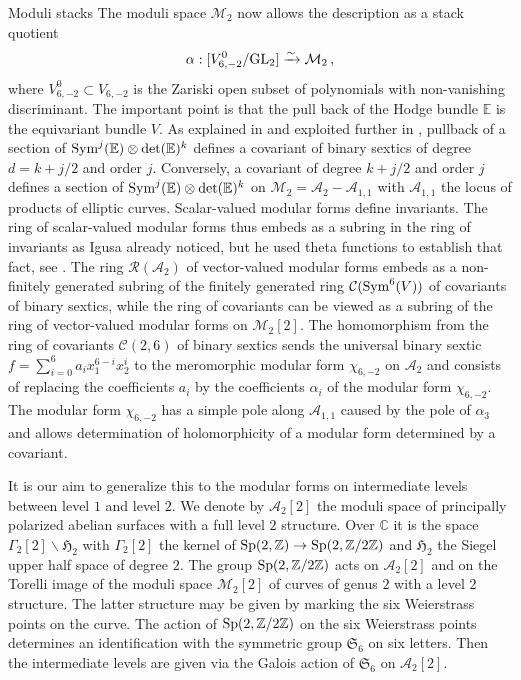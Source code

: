 \documentclass[12pt]{amsart}
\numberwithin{equation}{section}
\newcommand{\CC}{\mathbb C}
\newcommand{\EE}{\mathbb E}
\newcommand{\ZZ}{\mathbb Z}
\numberwithin{equation}{section}
\theoremstyle{definition}
\theoremstyle{remark}
\begin{document}
\begin{section}{Moduli stacks}
The moduli space $\mathcal{M}_2$ now allows the description as a stack quotient
$$
\alpha: [V_{6,-2}^0/{\rm GL}_2] \xrightarrow{\sim} \mathcal{M}_2\, ,
$$
where $V_{6,-2}^0 \subset V_{6,-2}$ is the Zariski open subset of polynomials with
non-vanishing discriminant. The important point is that the pull back of the Hodge
bundle ${\EE}$ is the equivariant bundle $V$. As explained in \cite{CFG1} and exploited further
in \cite{CFG2}, pullback of a section of ${\rm Sym}^j({\EE})\otimes \det({\EE})^k$
defines a covariant of binary sextics of degree $d=k+j/2$ and order $j$. Conversely, a covariant
of degree $k+j/2$ and order $j$ defines a section of ${\rm Sym}^j({\EE})\otimes \det({\EE})^k$
on $\mathcal{M}_2=\mathcal{A}_2-\mathcal{A}_{1,1}$ with $\mathcal{A}_{1,1}$
the locus of products of elliptic curves. Scalar-valued modular forms define invariants. 
The ring of scalar-valued modular forms
thus embeds as a subring in the ring of invariants as Igusa already noticed, but he used
theta functions to establish that fact, see \cite{Igusa1964}. The ring 
$\mathcal{R}(\mathcal{A}_2)$
of vector-valued modular forms
embeds as a non-finitely generated subring of the finitely generated ring $\mathcal{C}({\rm Sym}^6(V))$
of covariants
of binary sextics, while the ring of covariants can be viewed as a subring 
of the ring of vector-valued modular forms on $\mathcal{M}_2[2]$.
The homomorphism from the ring of covariants $\mathcal{C}(2,6)$ of
binary sextics sends the universal binary sextic $f=\sum_{i=0}^6 a_i x_1^{6-i}x_2^i$ 
to the meromorphic modular form
$\chi_{6,-2}$ on $\mathcal{A}_2$ 
and consists of replacing the coefficients $a_i$ by the coefficients $\alpha_i$
of the modular form $\chi_{6,-2}$. The modular form $\chi_{6,-2}$ has a simple pole
along $\mathcal{A}_{1,1}$ caused by the pole of $\alpha_3$ and allows determination of
holomorphicity of a modular form determined by a covariant.

\bigskip

It is our aim to generalize this to the modular forms on intermediate levels between
level $1$ and level $2$. We denote by $\mathcal{A}_2[2]$ the moduli space of
principally polarized abelian surfaces with a full level $2$ structure.
Over ${\CC}$ it is the space $\Gamma_2[2]\backslash \mathfrak{H}_2$ with
$\Gamma_2[2]$ the kernel of ${\rm Sp}(2,{\ZZ}) \to {\rm Sp}(2,{\ZZ}/2{\ZZ})$
and $\mathfrak{H}_2$ the Siegel upper half space of degree $2$.
The group ${\rm Sp}(2,{\ZZ}/2{\ZZ})$ acts on $\mathcal{A}_2[2]$ and on the 
Torelli image of the moduli space $\mathcal{M}_2[2]$ of curves of genus $2$ with a level $2$ structure.
The latter structure may be given by marking the six Weierstrass points on the curve.
The action of ${\rm Sp}(2,{\ZZ}/2{\ZZ})$ on the six Weierstrass points determines
an identification with the symmetric group $\mathfrak{S}_6$ on six letters. Then the intermediate
levels are given via the Galois action of $\mathfrak{S}_6$ on $\mathcal{A}_2[2]$.


\end{section}
\end{document}
